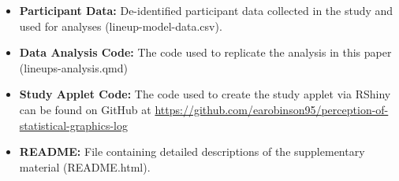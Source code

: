 \documentclass[12pt]{article}
\providecommand{\tightlist}{%
  \setlength{\itemsep}{0pt}\setlength{\parskip}{0pt}}
\begin{document}
\begin{itemize}
\tightlist
\item
  \textbf{Participant Data:} De-identified participant data collected in
  the study and used for analyses (lineup-model-data.csv).
\item
  \textbf{Data Analysis Code:} The code used to replicate the analysis
  in this paper (lineups-analysis.qmd)
\item
  \textbf{Study Applet Code:} The code used to create the study applet
  via RShiny can be found on GitHub at
  \url{https://github.com/earobinson95/perception-of-statistical-graphics-log}
\item
  \textbf{README:} File containing detailed descriptions of the
  supplementary material (README.html).
\end{itemize}



\end{document}
